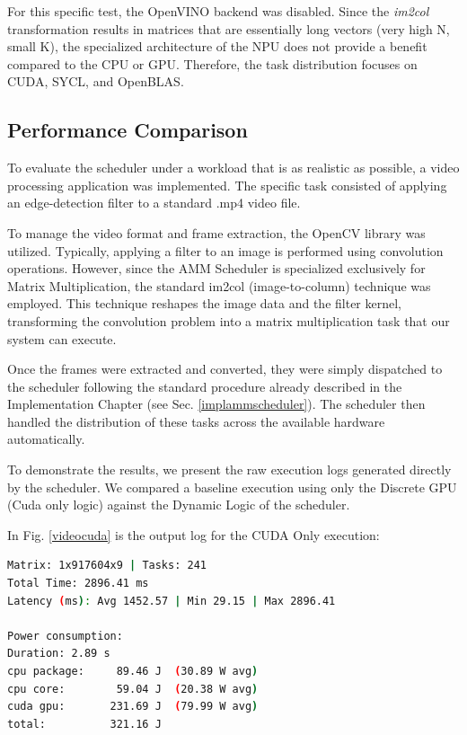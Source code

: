 For this specific test, the OpenVINO backend was disabled. Since the \textit{im2col} transformation results in matrices that are essentially long vectors (very high N, small K), the specialized architecture of the NPU does not provide a benefit compared to the CPU or GPU. Therefore, the task distribution focuses on CUDA, SYCL, and OpenBLAS.

\subsection{Performance Comparison}
To evaluate the scheduler under a workload that is as realistic as possible, a video processing application was implemented. The specific task consisted of applying an edge-detection filter to a standard .mp4 video file.

To manage the video format and frame extraction, the OpenCV library was utilized. Typically, applying a filter to an image is performed using convolution operations. However, since the AMM Scheduler is specialized exclusively for Matrix Multiplication, the standard im2col (image-to-column) technique was employed. This technique reshapes the image data and the filter kernel, transforming the convolution problem into a matrix multiplication task that our system can execute.

Once the frames were extracted and converted, they were simply dispatched to the scheduler following the standard procedure already described in the Implementation Chapter (see Sec. \ref{implammscheduler}). The scheduler then handled the distribution of these tasks across the available hardware automatically.

To demonstrate the results, we present the raw execution logs generated directly by the scheduler. We compared a baseline execution using only the Discrete GPU (Cuda only logic) against the Dynamic Logic of the scheduler.

In Fig. \ref{videocuda} is the output log for the CUDA Only execution:

\begin{lstlisting}[caption={Video Filter Output: CUDA Only}, language=bash, label={videocuda}]
Matrix: 1x917604x9 | Tasks: 241
Total Time: 2896.41 ms
Latency (ms): Avg 1452.57 | Min 29.15 | Max 2896.41

Power consumption:
Duration: 2.89 s
cpu package:     89.46 J  (30.89 W avg)
cpu core:        59.04 J  (20.38 W avg)
cuda gpu:       231.69 J  (79.99 W avg)
total:          321.16 J
\end{lstlisting}

